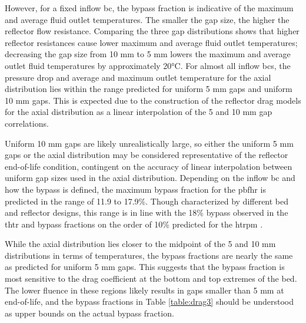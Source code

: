 However, for a fixed inflow \gls{bc}, the bypass fraction is indicative of the maximum and average fluid outlet temperatures. The smaller the gap size, the higher the reflector flow resistance. Comparing the three gap distributions shows that higher reflector resistances cause lower maximum and average fluid outlet temperatures; decreasing the gap size from 10 \si{\milli\meter} to 5 \si{\milli\meter} lowers the maximum and average outlet fluid temperatures by approximately 20\si{\celsius}. For almost all inflow \glspl{bc}, the pressure drop and average and maximum outlet temperature for the axial distribution lies within the range predicted for uniform 5 \si{\milli\meter} gaps and uniform 10 \si{\milli\meter} gaps. This is expected due to the construction of the reflector drag models for the axial distribution as a linear interpolation of the 5 and 10 \si{\milli\meter} gap correlations. 

Uniform 10 \si{\milli\meter} gaps are likely unrealistically large, so either the uniform 5 \si{\milli\meter} gaps or the axial distribution may be considered representative of the reflector end-of-life condition, contingent on the accuracy of linear interpolation between uniform gap sizes used in the axial distribution. Depending on the inflow \gls{bc} and how the bypass is defined, the maximum bypass fraction for the \gls{pbfhr} is predicted in the range of 11.9 to 17.9\%. Though characterized by different bed and reflector designs, this range is in line with the 18\% bypass observed in the \gls{thtr} \cite{baumer} and bypass fractions on the order of 10\% predicted for the \gls{htrpm} \cite{jun,jun2011}.

While the axial distribution lies closer to the midpoint of the 5 and 10 \si{\milli\meter} distributions in terms of temperatures, the bypass fractions are nearly the same as predicted for uniform 5 \si{\milli\meter} gaps. This suggests that the bypass fraction is most sensitive to the drag coefficient at the bottom and top extremes of the bed. The lower fluence in these regions likely results in gaps smaller than 5 \si{\milli\meter} at end-of-life, and the bypass fractions in Table \ref{table:drag3} should be understood as upper bounds on the actual bypass fraction.

